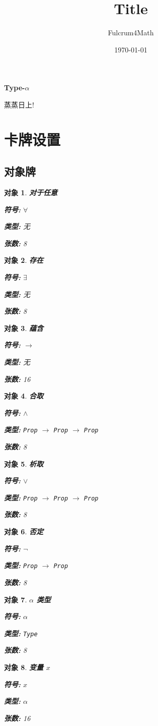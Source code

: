 \documentclass[UTF8]{ctexart}
\title{Title}
\author{Fulcrum4Math}
\date{\today}
\DeclareMathOperator{\0}{\mathbf{0}}                    %
\newcommand{\<}{\langle}
\renewcommand{\>}{\rangle}                              %
\newenvironment{dfn_box}{
    \begin{tcolorbox}[enhanced, colback=dfn_green2, boxrule=0pt, frame hidden,
        borderline west={0.7mm}{0.1mm}{dfn_green1},breakable]
    }
    {\end{tcolorbox}}
\theoremstyle{MyStyle} %
\newtheorem{definition}{对象}[subsection]
\newenvironment{obj}[4]
{
    \begin{dfn_box}
        \begin{definition}
            \textbf{#1}

            \textbf{符号: }#2
                
            \textbf{类型: }#3

            \textbf{张数: }#4
}
{
        \end{definition}
    \end{dfn_box}
}
\newcommand*{\lean}[1]{\texttt{\color{blue}#1}}
\begin{document}
    \begin{center}
        {\LARGE\textbf{Type-$\alpha$}}

        蒸蒸日上! 
    \end{center}

    \section{卡牌设置}

    \subsection{对象牌}
        
        \begin{obj}
            {对于任意}
            {$\forall$}
            {无}
            {8}
        \end{obj}

        \begin{obj}
            {存在}
            {$\exists$}
            {无}
            {8}
        \end{obj}

        \begin{obj}
            {蕴含}
            {$\to$}
            {无}
            {16}
        \end{obj}

        \begin{obj}
            {合取}
            {$\land$}
            {\lean{Prop} $\to$ \lean{Prop} $\to$ \lean{Prop}}
            {8}
        \end{obj}

        \begin{obj}
            {析取}
            {$\lor$}
            {\lean{Prop} $\to$ \lean{Prop} $\to$ \lean{Prop}}
            {8}
        \end{obj}

        \begin{obj}
            {否定}
            {$\neg$}
            {\lean{Prop} $\to$ \lean{Prop}}
            {8}
        \end{obj}

        \begin{obj}
            {$\alpha$ 类型}
            {$\alpha$}
            {\lean{Type}}
            {8}
        \end{obj}

        \begin{obj}
            {变量 $x$}
            {$x$}
            {$\alpha$}
            {16}
        \end{obj}
\end{document}
